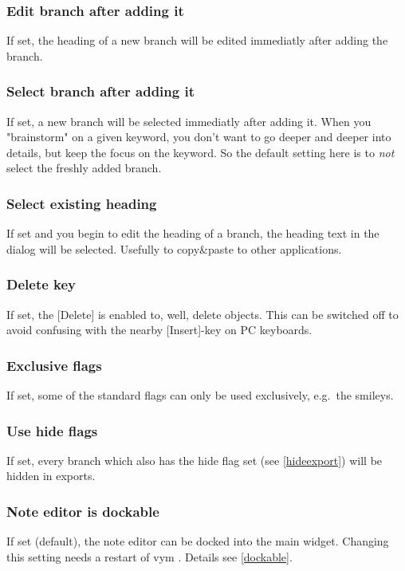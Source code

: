 \documentclass[12pt,a4paper]{article}
\newcommand{\vym}{{\sc vym }}
\newcommand{\key}[1]{[#1]}
\begin{document}
\begin{appendix}
\subsubsection*{Edit branch after adding it}
    If set, the heading of a new branch will be edited immediatly after
    adding the branch.

\subsubsection*{Select branch after adding it}
    If set, a new branch will be selected immediatly after adding it.
    When you "brainstorm" on a given keyword, you don't want to go
    deeper and deeper into details, but keep the focus on the keyword.
    So the default setting here is to {\em not} select the freshly added
    branch.
    
\subsubsection*{Select existing heading}
    If set and you begin to edit the heading of a branch, the heading
    text in the dialog will be selected. Usefully to copy\&paste to
    other applications.

\subsubsection*{Delete key}
    If set, the \key{Delete} is enabled to, well, delete objects. This
    can be switched off to avoid confusing with the nearby
    \key{Insert}-key on PC keyboards.

\subsubsection*{Exclusive flags}
    If set, some of the standard flags can only be used exclusively,
    e.g.~the smileys.

\subsubsection*{Use hide flags}
    If set, every branch which also has the hide flag set (see
    \ref{hideexport}) will be hidden in exports.

\subsubsection*{Note editor is dockable}
    If set (default), the note editor can be docked into the main
    widget. Changing this setting needs a restart of \vym. Details see
    \ref{dockable}.


\end{appendix}
\end{document}
